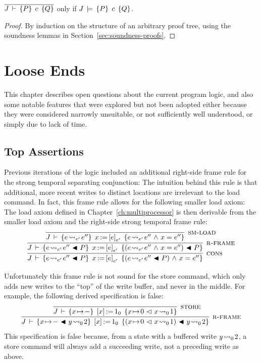 \documentclass[11pt]{report}
\begin{document}
\begin{theorem}[Soundness]
  \label{thm:soundness}
	$\overline{J\,\vdash\,\left\lbrace P \right\rbrace\;c\;\left\lbrace Q \right\rbrace}$ only if $J\,\models\,\left\lbrace P \right\rbrace\;c\;\left\lbrace Q \right\rbrace$. 
\end{theorem}

\begin{proof}
	By induction on the structure of an arbitrary proof tree, using the soundness lemmas in Section~\ref{sec:soundness-proofs}. 
\end{proof}

\chapter{Loose Ends}

This chapter describes open questions about the current program logic, and also some notable features that were explored but not been adopted either because they were considered narrowly unsuitable, or not sufficiently well understood, or simply due to lack of time. 

\section{Top Assertions}
\label{sec:top-assertion}

Previous iterations of the logic included an additional right-side frame rule for the strong temporal separating conjunction:  The intuition behind this rule is that additional, more recent writes to distinct locations are irrelevant to the load command. In fact, this frame rule allows for the following smaller load axiom:  The load axiom defined in Chapter~\ref{ch:multiprocessor} is then derivable from the smaller load axiom and the right-side strong temporal frame rule: \[ \infer[\textsc{cons}]{\spec{J}{e \fwrite{e'} e'' \fsseq P}{\cload{x}{e}_{e'}}{(e \fwrite{e'} e'' \fsseq P) \conj x = e''}}{\infer[\textsc{r-frame}]{\spec{J}{e \fwrite{e'} e'' \fsseq P}{\cload{x}{e}_{e'}}{(e \fwrite{e'} e'' \conj x = e'') \fsseq P }}{\infer[\textsc{sm-load}]{\spec{J}{e \fwrite{e'} e''}{\cload{x}{e}_{e'}}{e \fwrite{e'} e'' \conj x = e''}}{}}}\]

Unfortunately this frame rule is not sound for the store command, which only adds new writes to the ``top'' of the write buffer, and never in the middle. For example, the following derived specification is false: \[ \infer[\textsc{r-frame}]{\spec{J}{x \fpointsto - \fsseq y \fwrite{0} 2}{\cstore{x}{1}_0}{(x \fpointsto 0 \fseq x \fwrite{0} 1) \fsseq y \fwrite{0} 2}}{\infer[\textsc{store}]{\spec{J}{x \fpointsto - }{\cstore{x}{1}_0}{x \fpointsto 0 \fseq x \fwrite{0} 1}}{}}\] This specification is false because, from a state with a buffered write $y \!\leadsto_{0}\! 2$, a store command will always add a succeeding write, not a preceding write as above. 
\end{document}
